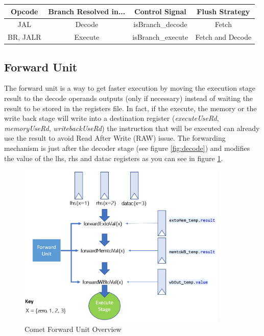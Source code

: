 \documentclass[10pt,letterpaper]{article}
\begin{document}
\begin{center}
 \begin{tabular}{||c c c c||} 
 \hline
 Opcode & Branch Resolved in... & Control Signal & Flush Strategy \\ [0.5ex] 
 \hline\hline
 JAL & Decode & isBranch\_decode & Fetch \\ 
 \hline
 BR, JALR & Execute & isBranch\_execute & Fetch and Decode\\
 \hline
\end{tabular}
\end{center}

\subsection{Forward Unit}

The forward unit is a way to get faster execution by moving the execution stage result to the decode operands outputs (only if necessary) instead of waiting the result to be stored in the registers file. In fact, if the execute, the memory or the write back stage will write into a destination register (\textit{executeUseRd}, \textit{memoryUseRd}, \textit{writebackUseRd}) the instruction that will be executed can already use the result to avoid Read After Write (RAW) issue. The forwarding mechanism is just after the decoder stage (see figure \ref{fig:decode}) and modifies the value of the lhs, rhs and datac registers as you can see in figure \ref{fig:fwunit}.

\vspace{0.5cm}

\begin{figure}[H]
\centering
\includegraphics[width=10cm]{img/forward_unit.PNG}
\caption{Comet Forward Unit Overview}
\label{fig:fwunit}
\end{figure}
\end{document}
